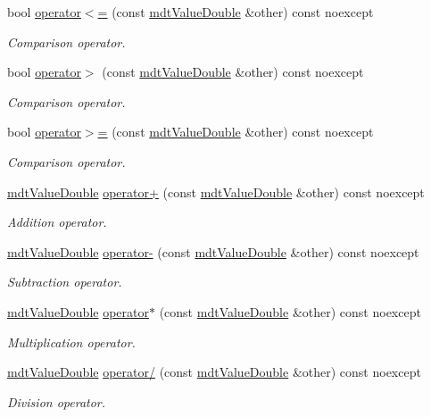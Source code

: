 \begin{DoxyCompactItemize}
bool \hyperlink{classmdt_value_double_adb69d10cc28ad6442c9eb7b7317c67c7}{operator$<$=} (const \hyperlink{classmdt_value_double}{mdt\-Value\-Double} \&other) const noexcept
\begin{DoxyCompactList}\small\item\em Comparison operator. \end{DoxyCompactList}\item 
bool \hyperlink{classmdt_value_double_a7fd521552c3dc3bd902c1aaf104e3c99}{operator$>$} (const \hyperlink{classmdt_value_double}{mdt\-Value\-Double} \&other) const noexcept
\begin{DoxyCompactList}\small\item\em Comparison operator. \end{DoxyCompactList}\item 
bool \hyperlink{classmdt_value_double_a01b70e7c7a3e025fde2cf7c2a830a25d}{operator$>$=} (const \hyperlink{classmdt_value_double}{mdt\-Value\-Double} \&other) const noexcept
\begin{DoxyCompactList}\small\item\em Comparison operator. \end{DoxyCompactList}\item 
\hyperlink{classmdt_value_double}{mdt\-Value\-Double} \hyperlink{classmdt_value_double_a7bc88a717bb2b5c133a9d31780e95e78}{operator+} (const \hyperlink{classmdt_value_double}{mdt\-Value\-Double} \&other) const noexcept
\begin{DoxyCompactList}\small\item\em Addition operator. \end{DoxyCompactList}\item 
\hyperlink{classmdt_value_double}{mdt\-Value\-Double} \hyperlink{classmdt_value_double_a3f354bde1c4240c0a71b9cad208b202d}{operator-\/} (const \hyperlink{classmdt_value_double}{mdt\-Value\-Double} \&other) const noexcept
\begin{DoxyCompactList}\small\item\em Subtraction operator. \end{DoxyCompactList}\item 
\hyperlink{classmdt_value_double}{mdt\-Value\-Double} \hyperlink{classmdt_value_double_ab1fbb3849fc5d35c9cff26667d36bc60}{operator$\ast$} (const \hyperlink{classmdt_value_double}{mdt\-Value\-Double} \&other) const noexcept
\begin{DoxyCompactList}\small\item\em Multiplication operator. \end{DoxyCompactList}\item 
\hyperlink{classmdt_value_double}{mdt\-Value\-Double} \hyperlink{classmdt_value_double_a564fa31d07ed68e35cabe6f86a7ff185}{operator/} (const \hyperlink{classmdt_value_double}{mdt\-Value\-Double} \&other) const noexcept
\begin{DoxyCompactList}\small\item\em Division operator. \end{DoxyCompactList}\end{DoxyCompactItemize}


